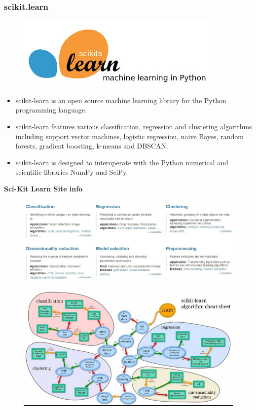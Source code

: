 \documentclass[MASTER.tex]{subfiles}
\begin{document}
\begin{frame}
	\frametitle{scikit.learn}
		\begin{figure}
			\centering
			\includegraphics[width=0.5\linewidth]{SKL-logo2}
		
		\end{figure}
		
	\begin{itemize}
	\item scikit-learn is an open source machine learning library for the Python programming language. 
	\item scikit-learn features various classification, regression and clustering algorithms including support vector machines, logistic regression, naive Bayes, random forests, gradient boosting, k-means and DBSCAN. \item scikit-learn is designed to interoperate with the Python numerical and scientific libraries NumPy and SciPy.
	\end{itemize}
\end{frame}
\begin{frame}
\textbf{Sci-Kit Learn Site info}
	\begin{figure}
\centering
\includegraphics[width=1.1\linewidth]{SKLsiteinfo}
\end{figure}
\end{frame}
\begin{frame}
\begin{figure}
\centering
\includegraphics[width=0.9\linewidth]{SKLCheatSheet}

\end{figure}
\end{frame}
\end{document}
